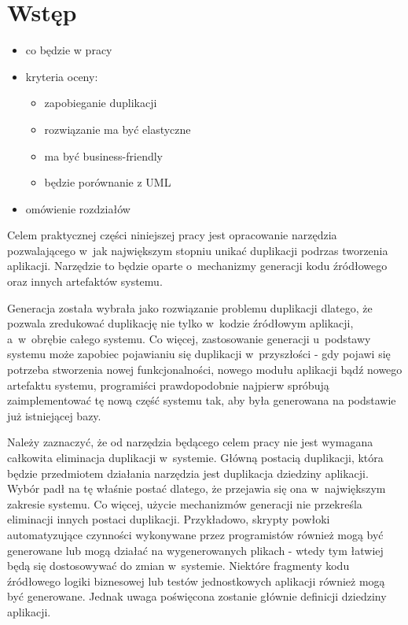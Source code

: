 \chapter{Wstęp} \label{chap:intro}

\begin{itemize}
 \item co będzie w pracy

 \item kryteria oceny:
  \begin{itemize}
   \item zapobieganie duplikacji
   \item rozwiązanie ma być elastyczne
   \item ma być business-friendly
   \item będzie porównanie z UML
  \end{itemize}
  
 \item omówienie rozdziałów
\end{itemize}


Celem praktycznej części niniejszej pracy jest opracowanie narzędzia pozwalającego w~jak największym stopniu unikać duplikacji podrzas tworzenia aplikacji.
Narzędzie to będzie oparte o~mechanizmy generacji kodu źródłowego oraz innych artefaktów systemu.

Generacja została wybrała jako rozwiązanie problemu duplikacji dlatego, że pozwala zredukować duplikację nie tylko w~kodzie źródłowym aplikacji, a~w~obrębie całego systemu.
Co więcej, zastosowanie generacji u~podstawy systemu może zapobiec pojawianiu się duplikacji w~przyszłości - gdy pojawi się potrzeba stworzenia nowej funkcjonalności, nowego modułu aplikacji bądź nowego artefaktu systemu, programiści prawdopodobnie najpierw spróbują zaimplementować tę nową część systemu tak, aby była generowana na podstawie już istniejącej bazy.

Należy zaznaczyć, że od narzędzia będącego celem pracy nie jest wymagana całkowita eliminacja duplikacji w~systemie.
Główną postacią duplikacji, która będzie przedmiotem działania narzędzia jest duplikacja dziedziny aplikacji.
Wybór padł na tę właśnie postać dlatego, że przejawia się ona w~największym zakresie systemu.
Co więcej, użycie mechanizmów generacji nie przekreśla eliminacji innych postaci duplikacji.
Przykładowo, skrypty powłoki automatyzujące czynności wykonywane przez programistów również mogą być generowane lub mogą działać na wygenerowanych plikach - wtedy tym łatwiej będą się dostosowywać do zmian w~systemie.
Niektóre fragmenty kodu źródłowego logiki biznesowej lub testów jednostkowych aplikacji również mogą być generowane.
Jednak uwaga poświęcona zostanie głównie definicji dziedziny aplikacji.
